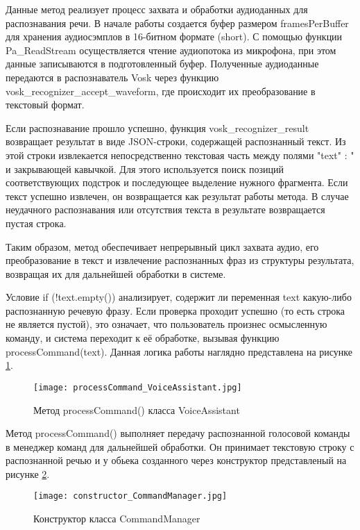 Данные метод реализует процесс захвата и обработки аудиоданных для распознавания речи. В начале работы создается буфер размером framesPerBuffer для хранения аудиосэмплов в 16-битном формате (short). С помощью функции Pa\_ReadStream осуществляется чтение аудиопотока из микрофона, при этом данные записываются в подготовленный буфер. Полученные аудиоданные передаются в распознаватель Vosk через функцию vosk\_recognizer\_accept\_waveform, где происходит их преобразование в текстовый формат.

Если распознавание прошло успешно, функция vosk\_recognizer\_result возвращает результат в виде JSON-строки, содержащей распознанный текст. Из этой строки извлекается непосредственно текстовая часть между полями \string"text\string" : \string" и закрывающей кавычкой. Для этого используется поиск позиций соответствующих подстрок и последующее выделение нужного фрагмента. Если текст успешно извлечен, он возвращается как результат работы метода. В случае неудачного распознавания или отсутствия текста в результате возвращается пустая строка.

Таким образом, метод обеспечивает непрерывный цикл захвата аудио, его преобразование в текст и извлечение распознанных фраз из структуры результата, возвращая их для дальнейшей обработки в системе.

Условие if (!text.empty()) анализирует, содержит ли переменная text какую-либо распознанную речевую фразу. Если проверка проходит успешно (то есть строка не является пустой), это означает, что пользователь произнес осмысленную команду, и система переходит к её обработке, вызывая функцию processCommand(text). Данная логика работы наглядно представлена на рисунке \ref{fig:processCommand_VoiceAssistant}.

\begin{figure}[H]
	\centering
	\texttt{[image: processCommand\_VoiceAssistant.jpg]}
	\caption{Метод processCommand()  класса VoiceAssistant}
	\label{fig:processCommand_VoiceAssistant}
\end{figure}

Метод processCommand() выполняет передачу распознанной голосовой команды в менеджер команд для дальнейшей обработки. Он принимает текстовую строку с распознанной речью и у обьека созданного через конструктор представленый на рисунке \ref{fig:constructor_CommandManager}.


\begin{figure}[H]
	\centering
	\texttt{[image: constructor\_CommandManager.jpg]}
	\caption{Конструктор класса CommandManager}
	\label{fig:constructor_CommandManager}
\end{figure}

